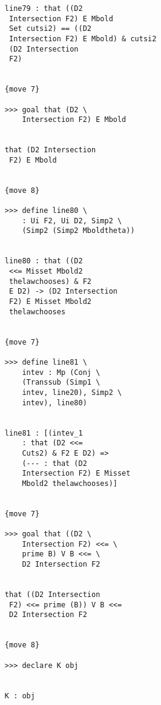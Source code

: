 \documentclass[12pt]{article}
\begin{document}
\begin{verbatim}
                        line79 : that ((D2 
                         Intersection F2) E Mbold 
                         Set cutsi2) == ((D2 
                         Intersection F2) E Mbold) & cutsi2 
                         (D2 Intersection 
                         F2)


                        {move 7}

                        >>> goal that (D2 \
                            Intersection F2) E Mbold


                        that (D2 Intersection 
                         F2) E Mbold


                        {move 8}

                        >>> define line80 \
                            : Ui F2, Ui D2, Simp2 \
                            (Simp2 (Simp2 Mboldtheta))


                        line80 : that ((D2 
                         <<= Misset Mbold2 
                         thelawchooses) & F2 
                         E D2) -> (D2 Intersection 
                         F2) E Misset Mbold2 
                         thelawchooses


                        {move 7}

                        >>> define line81 \
                            intev : Mp (Conj \
                            (Transsub (Simp1 \
                            intev, line20), Simp2 \
                            intev), line80)


                        line81 : [(intev_1 
                            : that (D2 <<= 
                            Cuts2) & F2 E D2) => 
                            (--- : that (D2 
                            Intersection F2) E Misset 
                            Mbold2 thelawchooses)]


                        {move 7}

                        >>> goal that ((D2 \
                            Intersection F2) <<= \
                            prime B) V B <<= \
                            D2 Intersection F2


                        that ((D2 Intersection 
                         F2) <<= prime (B)) V B <<= 
                         D2 Intersection F2


                        {move 8}

                        >>> declare K obj


                        K : obj



\end{verbatim}
\end{document}
